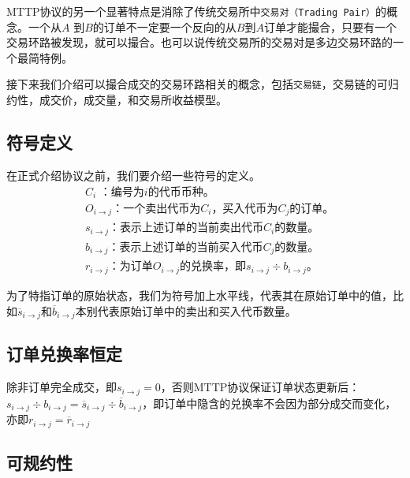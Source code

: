\documentclass[UTF8,nofonts]{ctexart}
\begin{document}
MTTP协议的另一个显著特点是消除了传统交易所中\texttt{交易对（Trading Pair）}的概念。一个从$A$ 到$B$的订单不一定要一个反向的从$B$到$A$订单才能撮合，只要有一个交易环路被发现，就可以撮合。也可以说传统交易所的交易对是多边交易环路的一个最简特例。

接下来我们介绍可以撮合成交的交易环路相关的概念，包括\texttt{交易链}，交易链的可归约性，成交价，成交量，和交易所收益模型。

\subsection{符号定义}

在正式介绍协议之前，我们要介绍一些符号的定义。
\[
\begin{split}
&C_{i}\text{ ：}\text{编号为$i$的代币币种。}\\
&O_{i\rightarrow j}\text{：}\text{一个卖出代币为$C_{i}$，买入代币为$C_{j}$的订单。}\\
&s_{i\rightarrow j}\text{：}\text{表示上述订单的当前卖出代币$C_{i}$的数量。}\\
&b_{i\rightarrow j}\text{：}\text{表示上述订单的当前买入代币$C_{j}$的数量。}\\
&r_{i\rightarrow j}\text{：}\text{为订单$O_{i\rightarrow j}$的兑换率，即$s_{i\rightarrow j} \div b_{i\rightarrow j}$。}
\end{split}
\]


为了特指订单的原始状态，我们为符号加上水平线，代表其在原始订单中的值，比如$\overline{s}_{i\rightarrow j}$和$\overline{b}_{i\rightarrow j}$本别代表原始订单中的卖出和买入代币数量。

\subsection{订单兑换率恒定\label{sec:consistrate}}

除非订单完全成交，即$s_{i\rightarrow j} = 0$，否则MTTP协议保证订单状态更新后：
$s_{i\rightarrow j} \div b_{i\rightarrow j} = \overline{s}_{i\rightarrow j}\div \overline{b}_{i\rightarrow j}$，即订单中隐含的兑换率不会因为部分成交而变化，亦即$r_{i\rightarrow j} = \overline{r}_{i\rightarrow j}$

\subsection{可规约性\label{sec:reducability}}
\end{document}
